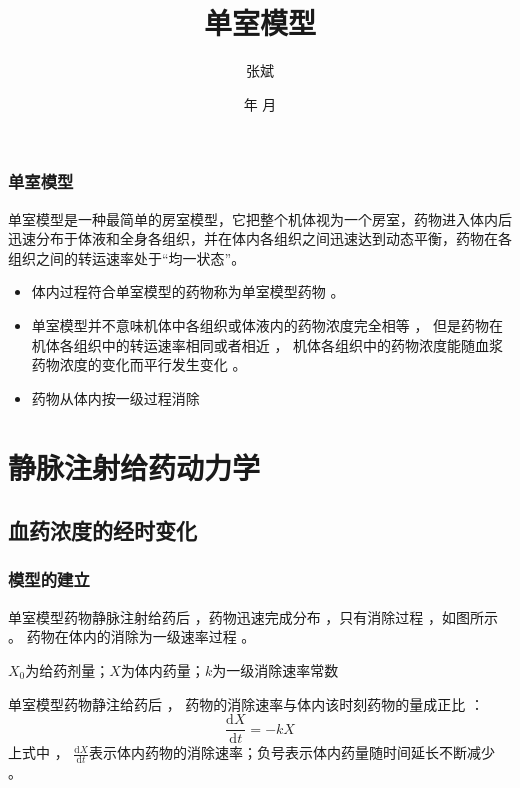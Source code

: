 \documentclass[dvipsnames, svgnames, x11names]{beamer}
\title{单室模型}
\author{张斌}
\institute[理工系]{河北农业大学 理工系}
\date{\the\year 年 \the\month 月}
\begin{document}
	
	\begin{frame}
		\titlepage
		\thispagestyle{empty}
		\addtocounter{framenumber}{-1}
	\end{frame}





\begin{frame}{}
	\begin{center}
		{\Huge \cbf{目 \ 录}}
	\end{center}
	\tableofcontents[subsectionstyle=hide/hide/show]
	\thispagestyle{empty}
	\addtocounter{framenumber}{-1}
\end{frame}

\begin{frame}
    \frametitle{单室模型}
    单室模型是一种最简单的房室模型，它把整个机体视为一个房室，药物进入体内后迅速分布于体液和全身各组织，并在体内各组织之间迅速达到动态平衡，药物在各组织之间的转运速率处于“均一状态”。
    
    \begin{itemize}
      \item 体内过程符合单室模型的药物称为单室模型药物 。
      \item 单室模型并不意味机体中各组织或体液内的药物浓度完全相等 ， 但是药物在机体各组织中的转运速率相同或者相近 ， 机体各组织中的药物浓度能随血浆药物浓度的变化而平行发生变化 。
      \item 药物从体内按一级过程消除
    \end{itemize}
    
\end{frame}


\section{静脉注射给药动力学}

\subsection{血药浓度的经时变化}

\begin{frame}
    \frametitle{模型的建立}
    单室模型药物静脉注射给药后 ，药物迅速完成分布 ，只有消除过程 ，如图所示 。 药物在体内的消除为一级速率过程 。
\begin{center}
\end{center}
$X_0$为给药剂量；$X$为体内药量；$k$为一级消除速率常数

单室模型药物静注给药后 ， 药物的消除速率与体内该时刻药物的量成正比 ：
\[
    \frac{\mathrm{d}X}{\mathrm{d}t}=-kX
\]
上式中 ， $\frac{\mathrm{d}X}{\mathrm{d}t}$表示体内药物的消除速率；负号表示体内药量随时间延长不断减少 。
\end{frame}
\end{document}
